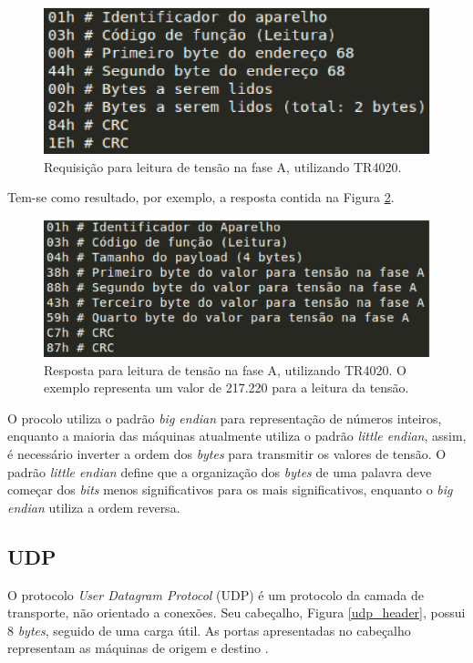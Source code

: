     \begin{figure}[!h]
        \centering
        \includegraphics[keepaspectratio=true,scale=0.8]{figuras/request_tr4020.eps}
        \caption{Requisição para leitura de tensão na fase A, utilizando TR4020.}
        \label{request_tr4020}
    \end{figure}

    Tem-se como resultado, por exemplo, a resposta contida na Figura \ref{request_tr4020}.

    \begin{figure}[!h]
        \centering
        \includegraphics[keepaspectratio=true,scale=0.8]{figuras/response_tr4020.eps}
        \caption{Resposta para leitura de tensão na fase A, utilizando TR4020. O exemplo representa um valor de 217.220 para a leitura da tensão.}
        \label{request_tr4020}
    \end{figure}

    O procolo utiliza o padrão \textit{big endian} \cite{tanenbaum_1998} para representação de números inteiros, enquanto a maioria das máquinas atualmente utiliza o padrão \textit{little endian}, assim, é necessário inverter a ordem dos \textit{bytes} para transmitir os valores de tensão. O padrão \textit{little endian} define que a organização dos \textit{bytes} de uma palavra deve começar dos \textit{bits} menos significativos para os mais significativos, enquanto o \textit{big endian} utiliza a ordem reversa.

    \subsection{UDP}
    O protocolo \textit{User Datagram Protocol} (UDP) é um protocolo da camada de transporte, não orientado a conexões. Seu cabeçalho, Figura \ref{udp_header}, possui 8 \textit{bytes}, seguido de uma carga útil. As portas apresentadas no cabeçalho representam as máquinas de origem e destino \cite{tanenbaum_2002}.

